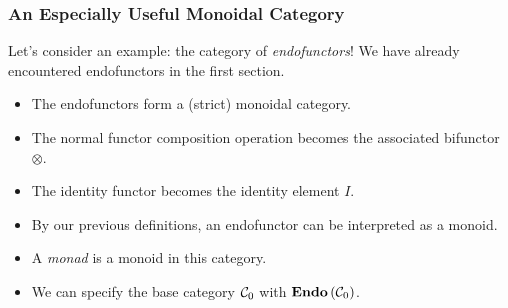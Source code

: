 \documentclass{beamer}
\numberwithin{figure}{section}
\begin{document}
\begin{frame}
        \frametitle{An Especially Useful Monoidal Category}
        Let's consider an example: the category of \textit{endofunctors}! We
        have already encountered endofunctors in the first section.
        \begin{itemize}
                \item The endofunctors form a (strict) monoidal category.
                \item The normal functor composition operation becomes the
                        associated bifunctor $\otimes$.
                \item The identity functor becomes the identity element $I$.
                \item By our previous definitions, an endofunctor can be
                        interpreted as a monoid.
                \item A \textit{monad} is a monoid in this category.
                \item We can specify the base category $\mathcal{C}_0$ with
                        $\operatorname{\mathbf{Endo}}{(\mathcal{C}_0)}$.
        \end{itemize}
\end{frame}
\end{document}
